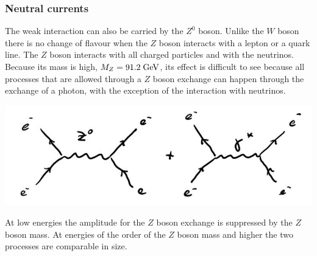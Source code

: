\documentclass[12pt]{article}
\begin{document}
\subsubsection{Neutral currents}
The weak interaction can also be carried by the $Z^0$ boson. Unlike the $W$ boson there is no change of flavour when the $Z$ boson interacts with a lepton or a quark line. The $Z$ boson interacts with all charged particles and with the neutrinos. Because its mass is high, $M_Z=91.2 \;{\rm GeV}$, its effect is difficult to see because all processes that are allowed through a $Z$ boson exchange can happen through the exchange of a photon, with the exception of the interaction with neutrinos. 
\begin{center}
\includegraphics[scale=0.4]{images/eeeeZgamma.png}
\end{center}
At low energies the amplitude for the $Z$ boson exchange is suppressed by the $Z$ boson mass. At energies of the order of the $Z$ boson mass and higher the two processes are comparable in size. 
\end{document}
